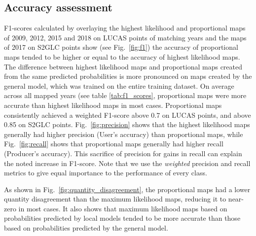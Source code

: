     \subsection{Accuracy assessment}
    
    F1-scores calculated by overlaying the highest likelihood and proportional maps of 2009, 2012, 2015 and 2018 on LUCAS points of matching years and the maps of 2017 on S2GLC points show (see Fig.~\ref{fig:f1}) the accuracy of proportional maps tended to be higher or equal to the accuracy of highest likelihood maps. The difference between highest likelihood maps and proportional maps created from the same predicted probabilities is more pronounced on maps created by the general model, which was trained on the entire training dataset. On average across all mapped years (see table \ref{tab:f1_scores}, proportional maps were more accurate than highest likelihood maps in most cases. Proportional maps consistently achieved a weighted F1-score above 0.7 on LUCAS points, and above 0.85 on S2GLC points. Fig.~\ref{fig:precision} shows that the highest likelihood maps generally had higher precision (User's accuracy) than proportional maps, while Fig.~\ref{fig:recall} shows that proportional maps generally had higher recall (Producer's accuracy). This sacrifice of precision for gains in recall can explain the noted increase in F1-score. Note that we use the \textit{weighted} precision and recall metrics to give equal importance to the performance of every class. 
    
    As shown in Fig.~\ref{fig:quantity_disagreement}, the proportional maps had a lower quantity disagreement than the maximum likelihood maps, reducing it to near-zero in most cases. It also shows that maximum likelihood maps based on probabilities predicted by local models tended to be more accurate than those based on probabilities predicted by the general model.

